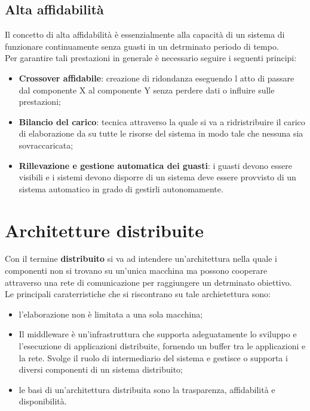 \documentclass{article}
\begin{document}
\subsection{Alta affidabilità}
Il concetto di alta affidabilità è essenzialmente alla capacità di un sistema di funzionare continuamente senza guasti in un detrminato periodo di tempo.\\
Per garantire tali prestazioni in generale è necessario seguire i seguenti principi:
\begin{itemize}
    \item \textbf{Crossover affidabile}: creazione di ridondanza eseguendo l atto di passare dal componente X al componente Y senza perdere dati o influire sulle prestazioni;
    \item \textbf{Bilancio del carico}:
    tecnica attraverso  la quale si va a ridristribuire
    il carico di elaborazione da su tutte le risorse del sistema in modo tale che nessuna sia sovraccaricata;
    \item \textbf{Rillevazione e gestione automatica dei guasti}:
    i guasti devono essere visibili e i  sistemi devono disporre di un sistema deve essere provvisto di un sistema automatico in grado di gestirli autonomamente.
\end{itemize}
\section{Architetture distribuite}
Con il termine \textbf{distribuito} si va ad intendere un'architettura nella quale i componenti non si trovano su un'unica macchina ma possono cooperare attraverso una rete di comunicazione per raggiungere un detrminato obiettivo.
\\Le principali caraterristiche che si riscontrano su tale archietettura sono:
\begin{itemize}
    \item l'elaborazione non è limitata a una sola macchina;
    \item Il middleware è un'infrastruttura che supporta adeguatamente lo sviluppo e l'esecuzione di applicazioni distribuite, fornendo un buffer tra le applicazioni e la rete. Svolge il ruolo di intermediario del sistema e gestisce o supporta i diversi componenti di un sistema distribuito;
    \item le basi di un'architettura distribuita sono la  trasparenza, affidabilità e disponibilità.
\end{itemize}
\end{document}
